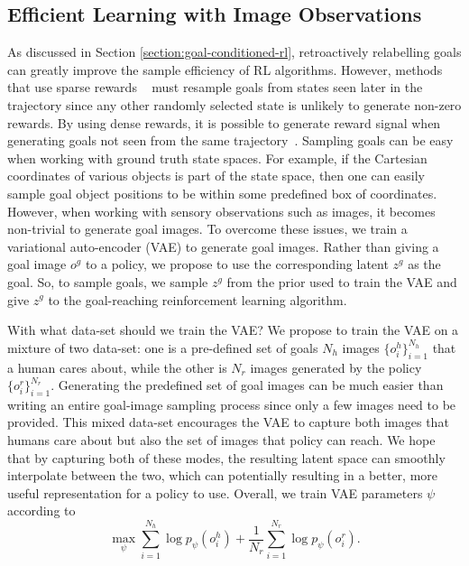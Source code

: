 \subsection{Efficient Learning with Image Observations}
As discussed in Section \ref{section:goal-conditioned-rl}, retroactively relabelling goals can greatly improve the sample efficiency of RL algorithms.
However, methods that use sparse rewards ~\cite{andrychowicz2017her} must resample goals from states seen later in the trajectory since any other randomly selected state is unlikely to generate non-zero rewards.
By using dense rewards, it is possible to generate reward signal when generating goals not seen from the same trajectory~\cite{pong2018tdm}.
Sampling goals can be easy when working with ground truth state spaces.
For example, if the Cartesian coordinates of various objects is part of the state space, then one can easily sample goal object positions to be within some predefined box of coordinates.
However, when working with sensory observations such as images, it becomes non-trivial to generate goal images.
To overcome these issues, we train a variational auto-encoder (VAE) to generate goal images.
Rather than giving a goal image $o^g$ to a policy, we propose to use the corresponding latent $z^g$ as the goal.
So, to sample goals, we sample $z^g$ from the prior used to train the VAE and give $z^g$ to the goal-reaching reinforcement learning algorithm.

With what data-set should we train the VAE?
We propose to train the VAE on a mixture of two data-set: one is a pre-defined set of goals $N_h$ images $\{o^h_i\}_{i=1}^{N_h}$ that a human cares about, while the other is $N_r$ images generated by the policy $\{o^r_i\}_{i=1}^{N_r}$.
Generating the predefined set of goal images can be much easier than writing an entire goal-image sampling process since only a few images need to be provided.
This mixed data-set encourages the VAE to capture both images that humans care about but also the set of images that policy can reach.
We hope that by capturing both of these modes, the resulting latent space can smoothly interpolate between the two, which can potentially resulting in a better, more useful representation for a policy to use.
Overall, we train VAE parameters $\psi$ according to
\begin{equation}
    \max_\psi \sum_{i=1}^{N_h} \log p_\psi(o^h_i) + \frac{1}{N_r} \sum_{i=1}^{N_r} \log p_\psi(o^r_i).
\end{equation}

